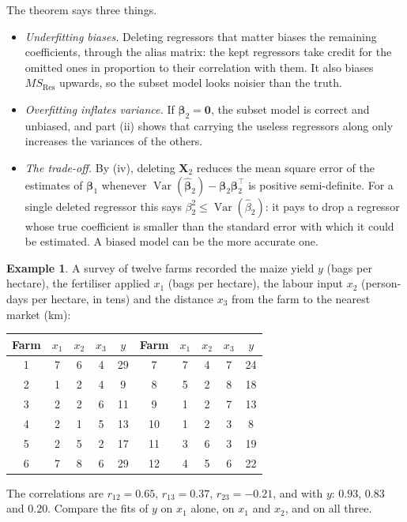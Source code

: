 \documentclass[11pt,a4paper]{article}
\numberwithin{equation}{section}
\theoremstyle{definition}
\newtheorem{exa}[thm]{Example}
\begin{document}
The theorem says three things.
\begin{itemize}
\item \emph{Underfitting biases.} Deleting regressors that matter biases the remaining
coefficients, through the alias matrix: the kept regressors take credit for the omitted ones in
proportion to their correlation with them. It also biases $MS_{\mathrm{Res}}$ upwards, so the
subset model looks noisier than the truth.
\item \emph{Overfitting inflates variance.} If $\boldsymbol\beta_2 = \mathbf{0}$, the subset model is correct
and unbiased, and part (ii) shows that carrying the useless regressors along only increases the
variances of the others.
\item \emph{The trade-off.} By (iv), deleting $\mathbf{X}_2$ reduces the mean square error of the
estimates of $\boldsymbol\beta_1$ whenever $\operatorname{Var}(\hat{\boldsymbol\beta}_2) - \boldsymbol\beta_2\boldsymbol\beta_2^\top$ is positive semi-definite.
For a single deleted regressor this says $\beta_2^2 \le \operatorname{Var}(\hat\beta_2)$: it pays to drop a
regressor whose true coefficient is smaller than the standard error with which it could be
estimated. A biased model can be the more accurate one.
\end{itemize}

\begin{exa}\label{exa:farms}
A survey of twelve farms recorded the maize yield $y$ (bags per hectare), the fertiliser applied
$x_1$ (bags per hectare), the labour input $x_2$ (person-days per hectare, in tens) and the
distance $x_3$ from the farm to the nearest market (km):
\begin{center}
\begin{tabular}{c|cccc||c|cccc}
Farm & $x_1$ & $x_2$ & $x_3$ & $y$ & Farm & $x_1$ & $x_2$ & $x_3$ & $y$ \\
\hline
1 & 7 & 6 & 4 & 29 & 7 & 7 & 4 & 7 & 24 \\
2 & 1 & 2 & 4 & 9 & 8 & 5 & 2 & 8 & 18 \\
3 & 2 & 2 & 6 & 11 & 9 & 1 & 2 & 7 & 13 \\
4 & 2 & 1 & 5 & 13 & 10 & 1 & 2 & 3 & 8 \\
5 & 2 & 5 & 2 & 17 & 11 & 3 & 6 & 3 & 19 \\
6 & 7 & 8 & 6 & 29 & 12 & 4 & 5 & 6 & 22 \\
\end{tabular}
\end{center}
The correlations are $r_{12} = 0.65$, $r_{13} = 0.37$, $r_{23} = -0.21$, and with $y$: $0.93$,
$0.83$ and $0.20$. Compare the fits of $y$ on $x_1$ alone, on $x_1$ and $x_2$, and on all three.
\end{exa}
\end{document}
